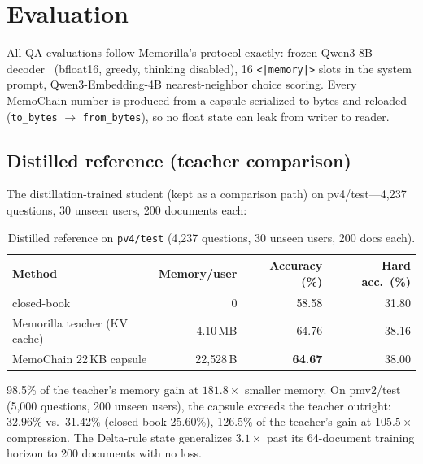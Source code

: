 \documentclass[11pt]{article}
\newcommand{\method}{MemoChain}
\begin{document}
\section{Evaluation}
\label{sec:eval}
All QA evaluations follow Memorilla's protocol exactly: frozen
Qwen3-8B decoder~\cite{qwen3} (bfloat16, greedy, thinking disabled),
16 \texttt{<|memory|>} slots in the system prompt, Qwen3-Embedding-4B
nearest-neighbor choice scoring. Every \method{} number is produced
from a capsule serialized to bytes and reloaded
(\texttt{to\_bytes} $\to$ \texttt{from\_bytes}), so no float state can
leak from writer to reader.

\subsection{Distilled reference (teacher comparison)}
The distillation-trained student (kept as a comparison path) on
pv4/test---4{,}237 questions, 30 unseen users, 200 documents each:
\begin{table}[ht]
\centering
\caption{Distilled reference on \texttt{pv4/test} (4{,}237 questions, 30 unseen users, 200 docs each).}
\label{tab:distilled}
\begin{tabular}{lrrr}
\toprule
Method & Memory/user & Accuracy (\%) & Hard acc.\ (\%)\\
\midrule
closed-book & 0 & 58.58 & 31.80\\
Memorilla teacher (KV cache) & 4.10\,MB & 64.76 & 38.16\\
\method{} 22\,KB capsule & 22{,}528\,B & \textbf{64.67} & 38.00\\
\bottomrule
\end{tabular}
\end{table}
98.5\% of the teacher's memory gain at $181.8\times$ smaller memory.
On pmv2/test (5{,}000 questions, 200 unseen users), the capsule exceeds
the teacher outright: 32.96\% vs.\ 31.42\% (closed-book 25.60\%),
126.5\% of the teacher's gain at $105.5\times$ compression. The
Delta-rule state generalizes $3.1\times$ past its 64-document training
horizon to 200 documents with no loss.
\end{document}
